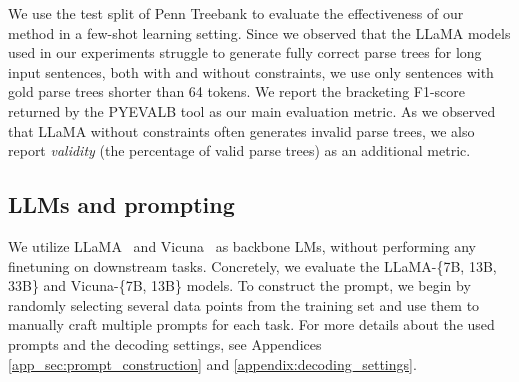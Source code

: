 We use the test split of Penn Treebank to evaluate the effectiveness of our method in a few-shot learning setting.
Since we observed that the LLaMA models used in our experiments struggle to generate fully correct parse trees for long input sentences, both with and without constraints,
we use only sentences with gold parse trees shorter than 64 tokens.
%
We report the bracketing F1-score
returned by the PYEVALB tool as our main evaluation metric.
%
As we observed that LLaMA without constraints often generates invalid parse trees,
we also report \textit{validity} (the percentage of valid parse trees)  as an additional metric.


\subsection{LLMs and prompting}\label{subsec:llm-prompting}

We utilize LLaMA~\cite{touvron2023llama} and Vicuna~\cite{vicuna2023} as backbone LMs, without performing any finetuning on downstream tasks.
Concretely, we evaluate the LLaMA-\{7B, 13B, 33B\} and Vicuna-\{7B, 13B\} models.
%
To construct the prompt, we begin by randomly selecting several data points from the training set and use them to manually craft multiple prompts for each task.
For more details about the used prompts and the decoding settings, see Appendices \ref{app_sec:prompt_construction} and \ref{appendix:decoding_settings}.




% 

